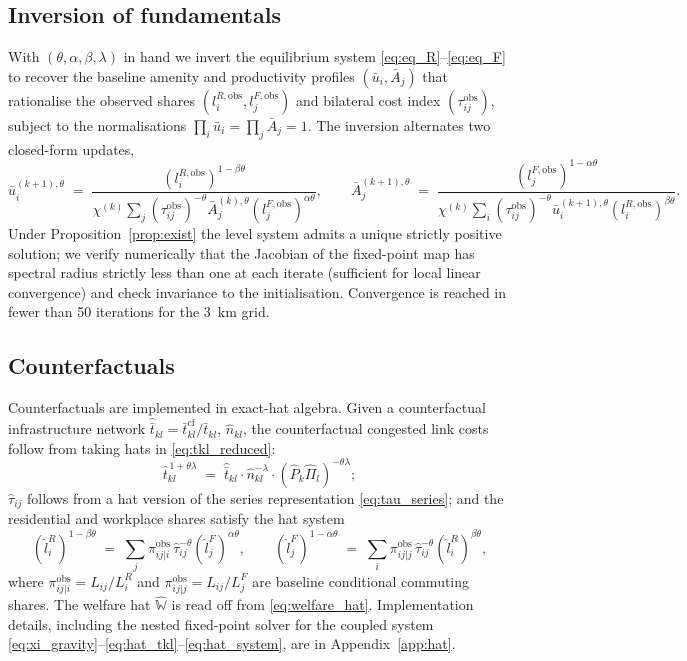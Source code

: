 \documentclass[12pt]{article}
\newcommand{\ubar}{\bar u}
\newcommand{\Abar}{\bar A}
\newcommand{\tbar}{\bar t}
\newcommand{\tkl}{t_{kl}}
\newcommand{\tijk}{\tau_{ij}}
\newcommand{\obs}{\mathrm{obs}}
\newcommand{\cf}{\mathrm{cf}}
\begin{document}
\subsection{Inversion of fundamentals}\label{ssec:invert}

With $(\theta,\alpha,\beta,\lambda)$ in hand we invert the equilibrium
system \eqref{eq:eq_R}--\eqref{eq:eq_F} to recover the baseline
amenity and productivity profiles $(\ubar_i,\Abar_j)$ that rationalise
the observed shares $(l_i^{R,\obs},l_j^{F,\obs})$ and bilateral cost
index $(\tijk^{\obs})$, subject to the normalisations
$\prod_i\ubar_i=\prod_j\Abar_j=1$.  The inversion alternates two
closed-form updates,
\begin{equation}
  \ubar_i^{(k+1),\theta}
  \;=\;
  \frac{(l_i^{R,\obs})^{1-\beta\theta}}
       {\chi^{(k)}\sum_{j}(\tijk^{\obs})^{-\theta}\Abar_j^{(k),\theta}(l_j^{F,\obs})^{\alpha\theta}},
  \qquad
  \Abar_j^{(k+1),\theta}
  \;=\;
  \frac{(l_j^{F,\obs})^{1-\alpha\theta}}
       {\chi^{(k)}\sum_{i}(\tijk^{\obs})^{-\theta}\ubar_i^{(k+1),\theta}(l_i^{R,\obs})^{\beta\theta}}.
  \label{eq:invert}
\end{equation}
Under Proposition~\ref{prop:exist} the level system admits a unique
strictly positive solution; we verify numerically that the Jacobian
of the fixed-point map has spectral radius strictly less than one at
each iterate (sufficient for local linear convergence) and check
invariance to the initialisation.  Convergence is reached in fewer
than 50 iterations for the 3~km grid.

\subsection{Counterfactuals}\label{sec:cf}

Counterfactuals are implemented in exact-hat algebra.  Given a
counterfactual infrastructure network
$\hat{\tbar}_{kl}=\tbar_{kl}^{\cf}/\tbar_{kl}$, $\hat n_{kl}$, the
counterfactual congested link costs follow from taking hats in
\eqref{eq:tkl_reduced}:
\begin{equation}
  \hat\tkl^{\,1+\theta\lambda}
  \;=\;\hat{\tbar}_{kl}\cdot\hat n_{kl}^{-\lambda}\cdot
       (\hat P_k\hat\Pi_l)^{-\theta\lambda};
  \label{eq:hat_tkl}
\end{equation}
$\hat\tau_{ij}$ follows from a hat version of the series
representation \eqref{eq:tau_series}; and the residential and
workplace shares satisfy the hat system
\begin{equation}
  (\hat l_i^R)^{1-\beta\theta}
  \;=\;\sum_{j}\pi_{ij|i}^{\obs}\,\hat\tau_{ij}^{-\theta}(\hat l_j^F)^{\alpha\theta},
  \qquad
  (\hat l_j^F)^{1-\alpha\theta}
  \;=\;\sum_{i}\pi_{ij|j}^{\obs}\,\hat\tau_{ij}^{-\theta}(\hat l_i^R)^{\beta\theta},
  \label{eq:hat_system}
\end{equation}
where $\pi_{ij|i}^{\obs}=L_{ij}/L_i^R$ and
$\pi_{ij|j}^{\obs}=L_{ij}/L_j^F$ are baseline conditional commuting
shares.  The welfare hat $\hat{\mathbb W}$ is read off from
\eqref{eq:welfare_hat}.  Implementation details, including the nested
fixed-point solver for the coupled system
\eqref{eq:xi_gravity}--\eqref{eq:hat_tkl}--\eqref{eq:hat_system}, are
in Appendix~\ref{app:hat}.
\end{document}

